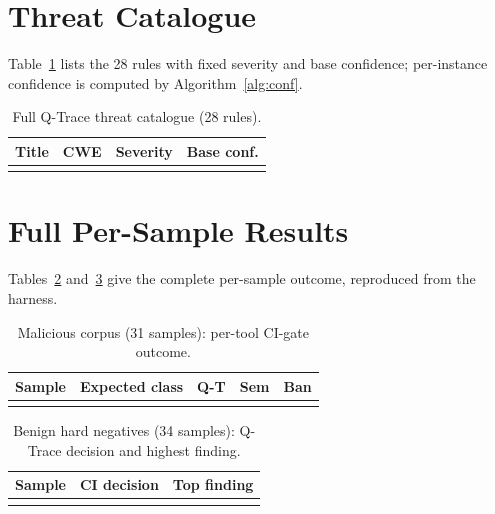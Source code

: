 \documentclass[runningheads]{llncs}
\begin{document}
\appendix
\section{Threat Catalogue}\label{app:catalog}
Table~\ref{tab:catalog} lists the 28 rules with fixed severity and base
confidence; per-instance confidence is computed by Algorithm~\ref{alg:conf}.

\begin{table}[t]
\centering
\caption{Full Q-Trace threat catalogue (28 rules).}
\label{tab:catalog}
\scriptsize
\begin{tabular}{@{}llll@{}}
\toprule
\textbf{Title} & \textbf{CWE} & \textbf{Severity} & \textbf{Base conf.}\\
\midrule
\\
\bottomrule
\end{tabular}
\end{table}

\section{Full Per-Sample Results}\label{app:persample}
Tables~\ref{tab:mal} and~\ref{tab:ben} give the complete per-sample outcome,
reproduced from the harness.

\begin{table}[t]
\centering
\caption{Malicious corpus (31 samples): per-tool CI-gate outcome.}
\label{tab:mal}
\scriptsize
\begin{tabular}{@{}llccc@{}}
\toprule
\textbf{Sample} & \textbf{Expected class} & \textbf{Q-T} & \textbf{Sem} & \textbf{Ban}\\
\midrule
\\
\bottomrule
\end{tabular}
\end{table}

\begin{table}[t]
\centering
\caption{Benign hard negatives (34 samples): Q-Trace decision and highest finding.}
\label{tab:ben}
\scriptsize
\begin{tabular}{@{}lll@{}}
\toprule
\textbf{Sample} & \textbf{CI decision} & \textbf{Top finding}\\
\midrule
\\
\bottomrule
\end{tabular}
\end{table}
\end{document}
